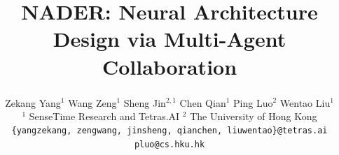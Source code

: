 \documentclass[10pt,twocolumn,letterpaper]{article}
\title{NADER: Neural Architecture Design via Multi-Agent Collaboration}
\author{Zekang Yang$^{1}$ \quad Wang Zeng$^{1}$ \quad Sheng Jin$^{2,1}$ \textsuperscript{\Letter} \quad Chen Qian$^{1}$ \quad Ping Luo$^{2}$ \quad Wentao Liu$^{1}$ \textsuperscript{\Letter}  \\
$^{1}$ SenseTime Research and Tetras.AI \quad
$^{2}$ The University of Hong Kong \\
\tt\small \{yangzekang, zengwang, jinsheng, qianchen, liuwentao\}@tetras.ai  \quad pluo@cs.hku.hk}
\begin{document}
\maketitle








{
    \small
    
    
}


\clearpage
\appendix
\setcounter{table}{0}
\renewcommand{\thetable}{A\arabic{table}}
\setcounter{figure}{0}
\renewcommand{\thefigure}{A\arabic{figure}}
\setcounter{section}{0}
\renewcommand{\thesection}{A\arabic{section}}

\end{document}
